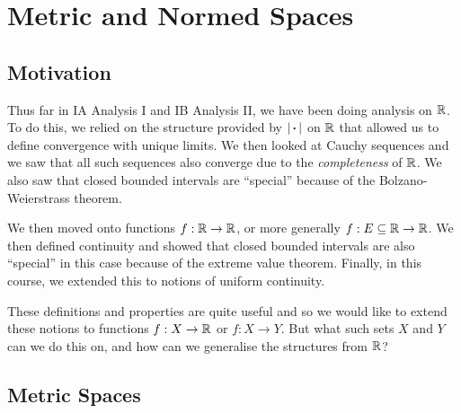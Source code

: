 \documentclass[../main.tex]{subfiles}
\begin{document}
\chapter{Metric and Normed Spaces}
\section{Motivation}
Thus far in IA Analysis I and IB Analysis II, we have been doing analysis on $\mathbb{R}$.
To do this, we relied on the structure provided by $|{\hspace{0.18em}\boldsymbol{\cdot}\hspace{0.18em}}|$ on $\mathbb{R}$ that allowed us to define convergence with unique limits.
We then looked at Cauchy sequences and we saw that all such sequences also converge due to the \textit{completeness} of $\mathbb{R}$.
We also saw that closed bounded intervals are ``special'' because of the Bolzano-Weierstrass theorem.

We then moved onto functions $f: \mathbb{R} \to \mathbb{R}$, or more generally $f: E \subseteq \mathbb{R} \to \mathbb{R}$.
We then defined continuity and showed that closed bounded intervals are also ``special'' in this case because of the extreme value theorem.
Finally, in this course, we extended this to notions of uniform continuity.

These definitions and properties are quite useful and so we would like to extend these notions to functions $f: X \to \mathbb{R}$ or $f: X \to Y$.
But what such sets $X$ and $Y$ can we do this on, and how can we generalise the structures from $\mathbb{R}$?
\section{Metric Spaces}
\end{document}
